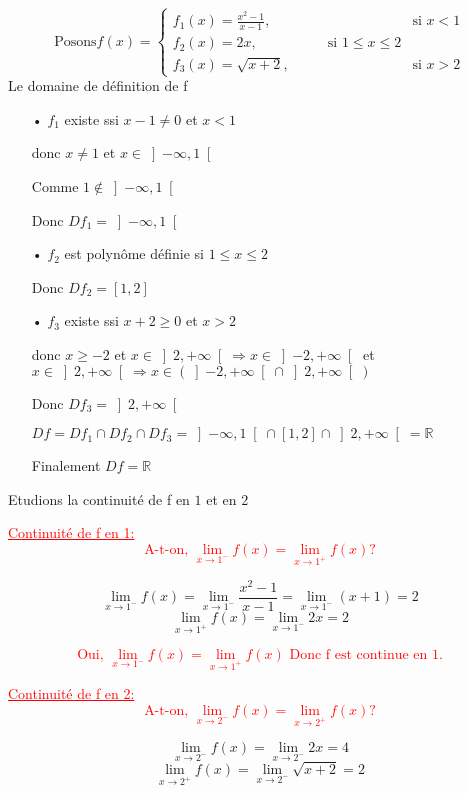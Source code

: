 \documentclass[12pt]{article}
\begin{document}
\[\text{Posons} f(x) = \begin{cases} 
  f_{1}(x)=\frac{x^2-1}{x-1}, & \text{si } x < 1 \\
   f_{2}(x)=2x,\quad\quad\quad\quad\quad \text{si } 1 \leq x \leq 2\\
  f_{3}(x)=\sqrt{x+2}, & \text{si } x > 2
\end{cases} \]
Le domaine de définition de f
\begin{itemize}
\item[•] $f_{1}$ existe ssi  $x-1\neq0$ et $x < 1$

donc $x\neq 1$ et $x \in \left] -\infty, 1\right[$

Comme  $1 \notin \left] -\infty, 1\right[$

Donc $Df_{1}=\left] -\infty, 1\right[$
\item[•] $f_{2}$ est polynôme définie si $1 \leq x \leq 2$

Donc $Df_{2}=\left[  1, 2\right] $
\item[•] $f_{3}$ existe ssi $x+2\geq 0$ et $x > 2$

donc $x\geq -2$ et $x \in \left]2, +\infty\right[  \Rightarrow x \in\left]-2, +\infty\right[$ et $x \in \left]2, +\infty\right[ \Rightarrow x\in (\left]-2, +\infty\right[\cap\left]2, +\infty\right[)$

Donc $Df_{3}=\left]2, +\infty\right[ $

$Df=Df_{1} \cap Df_{2} \cap Df_{3}=\left]-\infty, 1\right[\cap\left[  1, 2\right] \cap\left]2, +\infty\right[=\mathbb{R}$

Finalement $Df=\mathbb{R}$
\end{itemize}
Etudions la continuité de f en $1$ et en $2$

\textcolor{red}{\underline{Continuité de f en 1:}}
\textcolor{red}{\[\text{A-t-on, } \lim_{x \to 1^{-}}f(x)=\lim_{x \to 1^{+}}f(x) ?\]}

\[\lim_{x \to 1^{-}}f(x)=\lim_{x \to 1^{-}}\frac{x^2-1}{x-1}=\lim_{x \to 1^{-}}(x+1)=2\]
\[\lim_{x \to 1^{+}}f(x)=\lim_{x \to 1^{-}}2x=2\]

\textcolor{red}{\[\text{Oui, } \lim_{x \to 1^{-}}f(x)=\lim_{x \to 1^{+}}f(x)\text{ Donc f est continue en 1.}\]}

\textcolor{red}{\underline{Continuité de f en 2:}}
\textcolor{red}{\[\text{A-t-on, } \lim_{x \to 2^{-}}f(x)=\lim_{x \to 2^{+}}f(x) ?\]}

\[\lim_{x \to 2^{-}}f(x)=\lim_{x \to 2^{-}}2x=4\]
\[\lim_{x \to 2^{+}}f(x)=\lim_{x \to 2^{-}}\sqrt{x+2}=2\]
\end{document}

